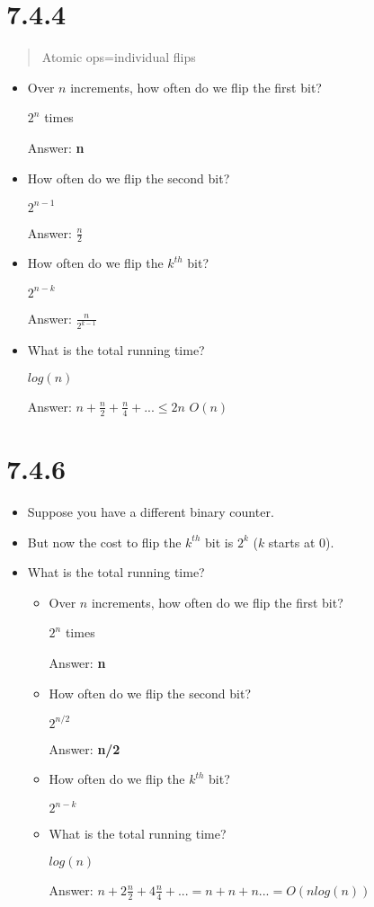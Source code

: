 \documentclass[12pt, letterpaper, twoside]{article}
\begin{document}
\section*{7.4.4}
\begin{quote}
    Atomic ops=individual flips
\end{quote}
\begin{itemize}
    \item Over $n$ increments, how often do we flip the first bit?
    
    $2^n$ times

    Answer: \textbf{n}
    \item How often do we flip the second bit?
    
    $2^{n-1}$

    Answer: \textbf{$\frac{n}{2}$}
    \item How often do we flip the $k^{th}$ bit?
    
    $2^{n-k}$
    
    Answer: \textbf{$\frac{n}{2^{k-1}}$}
    \item What is the total running time?
    
    $log(n)$

    Answer: \textbf{$n+\frac{n}{2}+\frac{n}{4}+...\le{2n}$}
    $O(n)$
\end{itemize}
\newpage
\section*{7.4.6}
\begin{itemize}
    \item Suppose you have a different binary counter.
    \item But now the cost to flip the $k^{th}$ bit is $2^k$ ($k$ starts at 0).
    \item What is the total running time?
    \begin{itemize}
        \item Over $n$ increments, how often do we flip the first bit?
    
        $2^n$ times

        Answer: \textbf{n}
        \item How often do we flip the second bit?
        
        $2^{n/2}$

        Answer: \textbf{n/2}
        \item How often do we flip the $k^{th}$ bit?
        
        $2^{n-k}$
        \item What is the total running time?
        
        $log(n)$

        Answer: \textbf{$n+2\frac{n}{2}+4\frac{n}{4}+...=n+n+n...=O(nlog(n))$}
    \end{itemize}
\end{itemize}
\end{document}
